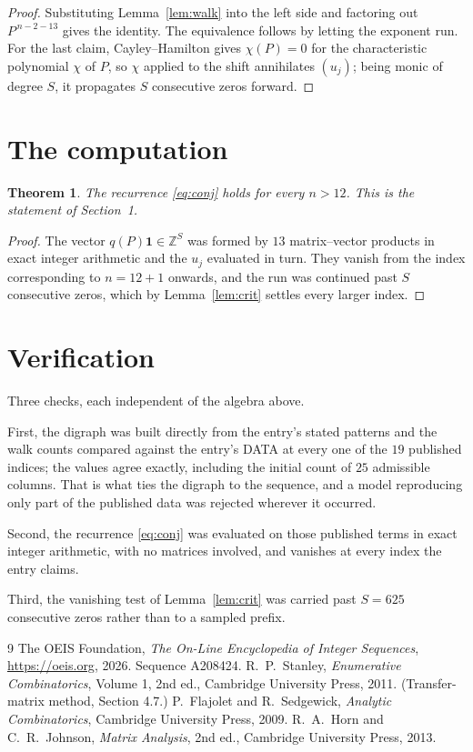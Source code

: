 \documentclass[11pt,a4paper]{article}
\theoremstyle{plain}
\newtheorem{theorem}{Theorem}
\theoremstyle{definition}
\begin{document}
\begin{proof}
Substituting Lemma~\ref{lem:walk} into the left side and factoring out
$P^{\,n-2-13}$ gives the identity. The equivalence follows by letting the exponent
run. For the last claim, Cayley--Hamilton gives $\chi(P)=0$ for the characteristic
polynomial $\chi$ of $P$, so $\chi$ applied to the shift annihilates $(u_j)$; being monic of
degree $S$, it propagates $S$ consecutive zeros forward.
\end{proof}

\section{The computation}

\begin{theorem}
The recurrence \eqref{eq:conj} holds for every $n>12$. This is the statement of
Section~1.
\end{theorem}

\begin{proof}
The vector $q(P)\mathbf{1}\in\mathbb{Z}^{S}$ was formed by $13$ matrix--vector
products in exact integer arithmetic and the $u_j$ evaluated in turn. They vanish from the
index corresponding to $n=12+1$ onwards, and the run was continued past $S$ consecutive
zeros, which by Lemma~\ref{lem:crit} settles every larger index.
\end{proof}

\section{Verification}

Three checks, each independent of the algebra above.

First, the digraph was built directly from the entry's stated patterns and the walk counts
compared against the entry's DATA at every one of the $19$ published indices; the
values agree exactly, including the initial count of $25$ admissible columns. That is
what ties the digraph to the sequence, and a model reproducing only part of the published
data was rejected wherever it occurred.

Second, the recurrence \eqref{eq:conj} was evaluated on those published terms in exact
integer arithmetic, with no matrices involved, and vanishes at every index the entry claims.

Third, the vanishing test of Lemma~\ref{lem:crit} was carried past $S=625$ consecutive
zeros rather than to a sampled prefix.

\begin{thebibliography}{9}
 The OEIS Foundation, \emph{The On-Line Encyclopedia of Integer
Sequences}, \url{https://oeis.org}, 2026. Sequence A208424.
 R.~P.~Stanley, \emph{Enumerative Combinatorics}, Volume 1, 2nd ed.,
Cambridge University Press, 2011. (Transfer-matrix method, Section 4.7.)
 P.~Flajolet and R.~Sedgewick, \emph{Analytic Combinatorics}, Cambridge
University Press, 2009.
 R.~A.~Horn and C.~R.~Johnson, \emph{Matrix Analysis}, 2nd ed., Cambridge
University Press, 2013.
\end{thebibliography}
\end{document}
